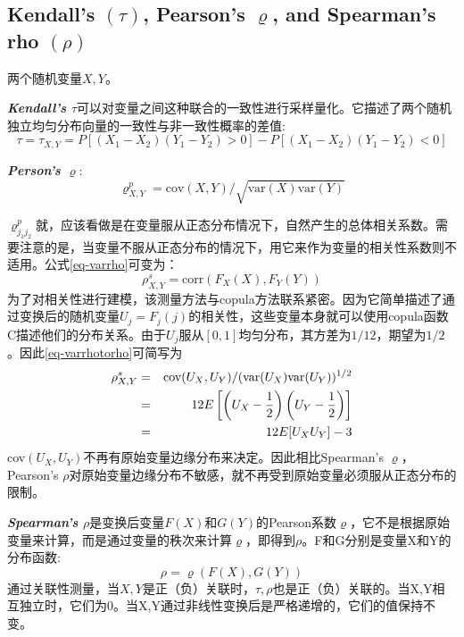 \subsection{Kendall's $(\tau)$, Pearson's $\varrho$, and Spearman's rho $(\rho)$}
两个随机变量$X,Y$。

\emph{\textbf{\textcolor[rgb]{1,0,0}{Kendall's $\tau$}}}可以对变量之间这种联合的一致性进行采样量化。它描述了两个随机独立均匀分布向量的一致性与非一致性概率的差值\cite{Montes2015}:
\begin{equation}
    \tau = \tau_{X,Y} = P[(X_1-X_2)(Y_1-Y_2) > 0] - P[(X_1-X_2)(Y_1-Y_2)<0]
    \label{eq-tau}
\end{equation}

\emph{\textbf{\textcolor[rgb]{1,0,0}{Person's $\varrho$}}}:
\begin{equation}   
    \label{eq-varrho}
    \varrho^{p}_{X,Y} = \text{cov}(X,Y)/\sqrt{\text{var}(X)\text{var}(Y)}
\end{equation}


$\varrho_{j_1 j_2}^{p}$就，应该看做是在变量服从正态分布情况下，自然产生的总体相关系数。需要注意的是，当变量不服从正态分布的情况下，用它来作为变量的相关性系数则不适用\cite{Smith2009}。公式\ref{eq-varrho}可变为：
\begin{equation}
    \rho_{X,Y}^s = \text{corr}(F_{X}(X),F_{Y}(Y))
    \label{eq-varrhotorho}
\end{equation}
为了对相关性进行建模，该测量方法与copula方法联系紧密。因为它简单描述了通过变换后的随机变量$U_j = F_j(j)$的相关性，这些变量本身就可以使用copula函数C描述他们的分布关系。\textcolor[rgb]{1,0,0}{由于$U_j$服从$[0,1]$均匀分布}，其方差为$1/12$，期望为$1/2$。因此\cref{eq-varrhotorho}可简写为
\begin{eqnarray}
    \rho_{X,Y}^s &=& \text{cov}(U_{X},U_{Y})/(\text{var}(U_{X})\text{var}(U_{Y}))^{1/2} \notag \\
    &=& 12E \left[ \left(U_{X} - \dfrac{1}{2}\right)\left(U_{Y} - \dfrac{1}{2}\right) \right] \notag \\
    &=& 12E [U_{X}U_{Y}] -3
    \label{eq-rhoSimplified}
\end{eqnarray}
cov$(U_X,U_Y)$不再有原始变量边缘分布来决定。因此相比Spearman's $\varrho$，Pearson's $\rho$对原始变量边缘分布不敏感，就不再受到原始变量必须服从正态分布的限制。



\emph{\textbf{\textcolor[rgb]{1,0,0}{Spearman's $\rho$}}}是变换后变量$F(X)$和$G(Y)$的Pearson系数$\varrho$\cite{Montes2015}，它不是根据原始变量来计算，而是通过变量的秩次来计算$\varrho$，即得到$\rho$。F和G分别是变量X和Y的分布函数:
\begin{equation}
    \label{eq-rho}
    \rho = \varrho(F(X),G(Y))
\end{equation}
通过关联性测量，当$X,Y$是正（负）关联时，$\tau,\rho$也是正（负）关联的。当X,Y相互独立时，它们为0。当X,Y通过非线性变换后是严格递增的，它们的值保持不变。

